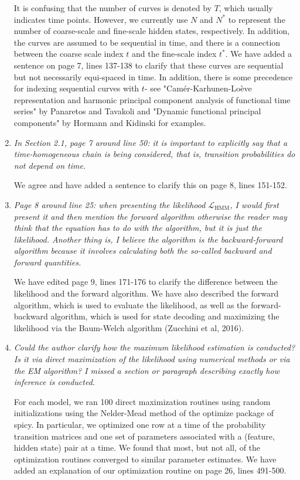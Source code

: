 \documentclass{article}
\begin{document}
\begin{enumerate}
    It is confusing that the number of curves is denoted by $T$, which usually indicates time points. However, we currently use $N$ and $N^*$ to represent the number of coarse-scale and fine-scale hidden states, respectively. In addition, the curves are assumed to be sequential in time, and there is a connection between the coarse scale index $t$ and the fine-scale index $t^*$. We have added a sentence on page 7, lines 137-138 to clarify that these curves are sequential but not necessarily equi-spaced in time. In addition, there is some precedence for indexing sequential curves with $t$- see "Cam\'er-Karhunen-Lo\`eve representation and harmonic principal component analysis of functional time series" by Panaretos and Tavakoli and "Dynamic functional principal components" by Hormann and Kidinski for examples.
    
    \item \textit{In Section 2.1, page 7 around line 50: it is important to explicitly say that a time-homogeneous chain is being considered, that is, transition probabilities do not depend on time.}
    
    We agree and have added a sentence to clarify this on page 8, lines 151-152.
    
    \item \textit{Page 8 around line 25: when presenting the likelihood $\mathcal{L}_{\text{HMM}}$, I would first present it and then mention the forward algorithm otherwise the reader may think that the equation has to do with the algorithm, but it is just the likelihood. Another thing is, I believe the algorithm is the backward-forward algorithm because it involves calculating both the so-called backward and forward quantities.}
    
    We have edited page 9, lines 171-176 to clarify the difference between the likelihood and the forward algorithm. We have also described the forward algorithm, which is used to evaluate the likelihood, as well as the forward-backward algorithm, which is used for state decoding and maximizing the likelihood via the Baum-Welch algorithm (Zucchini et al, 2016).
    
    \item \textit{Could the author clarify how the maximum likelihood estimation is conducted? Is it via direct maximization of the likelihood using numerical methods or via the EM algorithm? I missed a section or paragraph describing exactly how inference is conducted. }
    
    For each model, we ran 100 direct maximization routines using random initializations using the Nelder-Mead method of the optimize package of spicy. In particular, we optimized one row at a time of the probability transition matrices and one set of parameters associated with a (feature, hidden state) pair at a time. We found that most, but not all, of the optimization routines converged to similar parameter estimates. We have added an explanation of our optimization routine on page 26, lines 491-500.
    

\end{enumerate}
\end{document}

